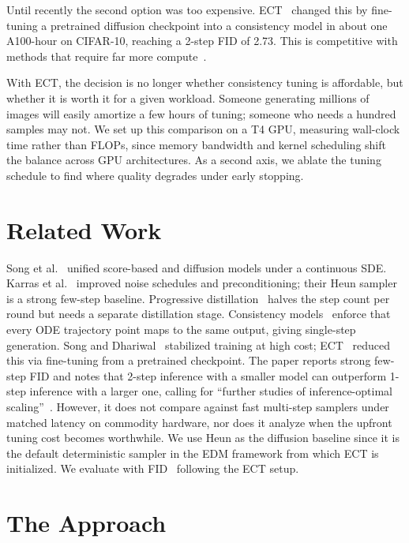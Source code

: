 \documentclass{article}
\begin{document}
Until recently the second option was too expensive. ECT~\cite{geng2025ect} changed this by fine-tuning a pretrained diffusion checkpoint into a consistency model in about one A100-hour on CIFAR-10, reaching a 2-step FID of 2.73. This is competitive with methods that require far more compute~\cite{song2024improved}.

With ECT, the decision is no longer whether consistency tuning is affordable, but whether it is worth it for a given workload. Someone generating millions of images will easily amortize a few hours of tuning; someone who needs a hundred samples may not. We set up this comparison on a T4 GPU, measuring wall-clock time rather than FLOPs, since memory bandwidth and kernel scheduling shift the balance across GPU architectures. As a second axis, we ablate the tuning schedule to find where quality degrades under early stopping.

\section{Related Work}

Song et al.~\cite{song2021scorebased} unified score-based and diffusion models under a continuous SDE. Karras et al.~\cite{karras2022edm} improved noise schedules and preconditioning; their Heun sampler is a strong few-step baseline. Progressive distillation~\cite{salimans2022progressive} halves the step count per round but needs a separate distillation stage. Consistency models~\cite{song2023consistency} enforce that every ODE trajectory point maps to the same output, giving single-step generation. Song and Dhariwal~\cite{song2024improved} stabilized training at high cost; ECT~\cite{geng2025ect} reduced this via fine-tuning from a pretrained checkpoint. The paper reports strong few-step FID and notes that 2-step inference with a smaller model can outperform 1-step inference with a larger one, calling for ``further studies of inference-optimal scaling''~\cite{geng2025ect}. However, it does not compare against fast multi-step samplers under matched latency on commodity hardware, nor does it analyze when the upfront tuning cost becomes worthwhile. We use Heun as the diffusion baseline since it is the default deterministic sampler in the EDM framework from which ECT is initialized. We evaluate with FID~\cite{heusel2017fid} following the ECT setup.

\section{The Approach}
\end{document}
